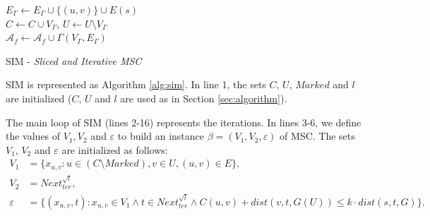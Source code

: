 \begin{algorithm}[t]
{{    $E_{\varGamma} \gets E_{\varGamma} \cup \{(u, v)\} \cup E(s)$ \\ %
  }
    $C \gets C \cup V_\varGamma$, $U \gets U \setminus V_\Gamma$\\
    $\mathcal{A}_f \gets \mathcal{A}_f \cup \Gamma(V_\Gamma,E_\Gamma)$
  }
\caption{SIM - \emph{Sliced and Iterative MSC}} 
\label{alg:sim}
\end{algorithm}  

SIM is represented as Algorithm \ref{alg:sim}. In line 1, the sets $C$, $U$, $Marked$ and $l$ are initialized ($C$, $U$ and $l$ are used as in Section \ref{sec:algorithm}). 

The main loop of SIM (lines 2-16) represents the iterations. In lines 3-6, we define the values of $V_1, V_2$ and $\varepsilon$ to build an instance
$\beta = (V_1, V_2, \varepsilon)$ of MSC. The sets $V_1$, $V_2$ and $\varepsilon$ are initialized as follows:
\begin{align*}
V_1& = \lbrace x_{u,v} : u \in (C \setminus Marked), v \in U, (u,v) \in E \rbrace,\\ 
V_2& = Next^{\sqrt{l}}_{ter},\\ 
\varepsilon& = \{(x_{u,v}, t) : x_{u,v} \in V_1 \land t \in Next^{\sqrt{l}}_{ter} \land C(u,v) + dist(v,t, G(U)) \leq k \cdot dist(s,t,G)\}.
\end{align*}

